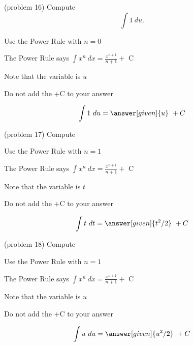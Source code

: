 \documentclass{ximera}
\begin{document}
\begin{problem}(problem 16)
Compute 
\[
\int 1 \ du.
\]


\begin{hint}
Use the Power Rule with $n=0$
\end{hint}
\begin{hint}
The Power Rule says $\int x^n \ dx = \frac{x^{n+1}}{n+1} +$ C
\end{hint}
\begin{hint}
Note that the variable is $u$
\end{hint}
\begin{hint}
\begin{center}
Do not add the +C to your answer
\end{center}
\end{hint}

\[
\int 1 \ du =
\answer[given]{u} \ + C
\]
\end{problem}




\begin{problem}(problem 17)
Compute 

\begin{hint}
Use the Power Rule with $n=1$
\end{hint}
\begin{hint}
The Power Rule says $\int x^n \ dx = \frac{x^{n+1}}{n+1} +$ C
\end{hint}
\begin{hint}
Note that the variable is $t$
\end{hint}
\begin{hint}
\begin{center}
Do not add the +C to your answer
\end{center}
\end{hint}

\[
\int t \ dt =
\answer[given]{t^2 /2} \ + C
\]
\end{problem}



\begin{problem}(problem 18)
Compute 

\begin{hint}
Use the Power Rule with $n=1$
\end{hint}
\begin{hint}
The Power Rule says $\int x^n \ dx = \frac{x^{n+1}}{n+1} +$ C
\end{hint}
\begin{hint}
Note that the variable is $u$
\end{hint}
\begin{hint}
\begin{center}
Do not add the +C to your answer
\end{center}
\end{hint}

\[
\int u \ du =
\answer[given]{u^2 /2} \ + C
\]
\end{problem}
\end{document}
